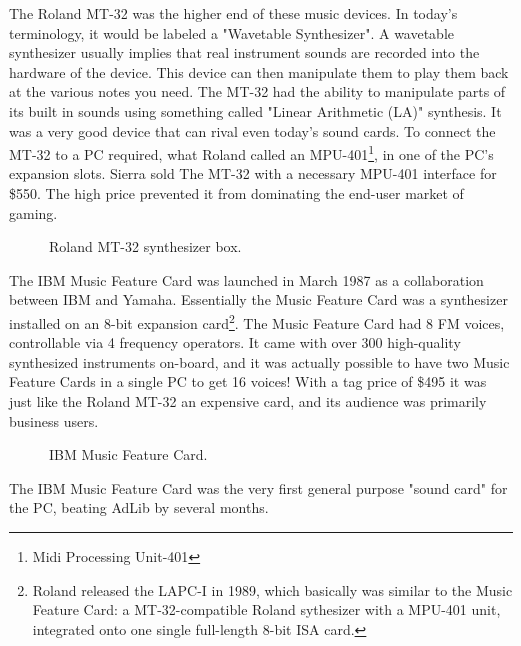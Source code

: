 \documentclass[book.tex]{subfiles}
\begin{document}
\par
The Roland MT-32 was the higher end of these music devices. In today's terminology, it would be labeled a "Wavetable Synthesizer". A wavetable synthesizer usually implies that real instrument sounds are recorded into the hardware of the device. This device can then manipulate them to play them back at the various notes you need. The MT-32 had the ability to manipulate parts of its built in sounds using something called "Linear Arithmetic (LA)" synthesis. It was a very good device that can rival even today's sound cards. To connect the MT-32 to a PC required, what Roland called an MPU-401\footnote{Midi Processing Unit-401}, in one of the PC's expansion slots. Sierra sold The MT-32 with a necessary MPU-401 interface for \$550. The high price prevented it from dominating the end-user market of gaming.\\

\par
  \begin{figure}[H] 
    \centering 
    \caption{Roland MT-32 synthesizer box.}
  \end{figure}


\par
The IBM Music Feature Card was launched in March 1987 as a collaboration between IBM and Yamaha. Essentially the Music Feature Card was a synthesizer installed on an 8-bit expansion card\footnote{Roland released the LAPC-I in 1989, which basically was similar to the Music Feature Card: a MT-32-compatible Roland sythesizer with a MPU-401 unit, integrated onto one single full-length 8-bit ISA card.}. The Music Feature Card had 8 FM voices, controllable via 4 frequency operators. It came with over 300 high-quality synthesized instruments on-board, and it was actually possible to have two Music Feature Cards in a single PC to get 16 voices! With a tag price of \$495 it was just like the Roland MT-32 an expensive card, and its audience was primarily business users.\\

\par
  \begin{figure}[H] 
    \centering 
    \caption{IBM Music Feature Card.}
  \end{figure}

\par
   The IBM Music Feature Card was the very first general purpose "sound card" for the PC, beating AdLib by several months. \\
\end{document}
